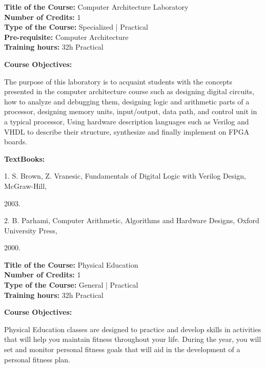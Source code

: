 \documentclass[12pt,a4paper]{article}
\begin{document}
\newpage
\textbf{Title of the Course:} Computer Architecture Laboratory\\
\textbf{Number of Credits:} 1\\
\textbf{Type of the Course:} Specialized | Practical\\
\textbf{Pre-requisite:} Computer Architecture\\
\textbf{Training hours:} 32h Practical\par\vspace{4pt}
\textbf{Course Objectives:}\par\vspace{2pt}
The purpose of this laboratory is to acquaint students with the concepts presented in the computer
architecture course such as designing digital circuits, how to analyze and debugging them,
designing logic and arithmetic parts of a processor, designing memory units, input/output, data
path, and control unit in a typical processor, Using hardware description languages such as Verilog
and VHDL to describe their structure, synthesize and finally implement on FPGA boards.\par\vspace{4pt}
\textbf{TextBooks:}\par\vspace{2pt}
1. S. Brown, Z. Vranesic, Fundamentals of Digital Logic with Verilog Design, McGraw-Hill,\par
2003.\par
2. B. Parhami, Computer Arithmetic, Algorithms and Hardware Designs, Oxford University Press,\par
2000.\par
\vspace{4pt}

\newpage
\nopagebreak
\textbf{Title of the Course:} Physical Education\\
\textbf{Number of Credits:} 1\\
\textbf{Type of the Course:} General | Practical\\
\textbf{Training hours:} 32h Practical\par\vspace{4pt}
\textbf{Course Objectives:}\par\vspace{2pt}
Physical Education classes are designed to practice and develop skills in activities that will help
you maintain fitness throughout your life. During the year, you will set and monitor personal
fitness goals that will aid in the development of a personal fitness plan.\par\vspace{4pt}
\end{document}
